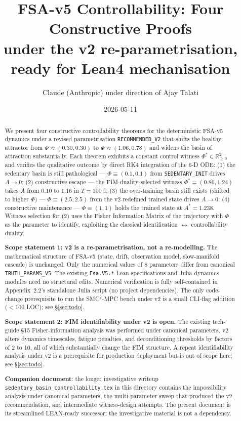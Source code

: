 \documentclass[11pt,a4paper]{article}
\title{FSA-v5 Controllability: Four Constructive Proofs\\
\large under the v2 re-parametrisation, ready for Lean4 mechanisation}
\author{Claude (Anthropic) under direction of Ajay Talati}
\date{2026-05-11}
\theoremstyle{definition}
\newcommand{\R}{\mathbb{R}}
\begin{document}
\maketitle

\begin{abstract}
We present four constructive controllability theorems for the deterministic FSA-v5 dynamics under a revised parametrisation \texttt{RECOMMENDED\_V2} that shifts the healthy attractor from $\Phi \approx (0.30, 0.30)$ to $\Phi \approx (1.06, 0.78)$ and widens the basin of attraction substantially. Each theorem exhibits a constant control witness $\Phi^* \in \R_{\ge 0}^2$ and verifies the qualitative outcome by direct RK4 integration of the 6-D ODE: (1) the sedentary basin is still pathological — $\Phi \equiv (0.1, 0.1)$ from \texttt{SEDENTARY\_INIT} drives $A \to 0$; (2) constructive escape — the FIM-duality-selected witness $\Phi^* = (0.86, 1.24)$ takes $A$ from $0.10$ to $1.16$ in $T = 100$\,d; (3) the over-training basin still exists (shifted to higher $\Phi$) — $\Phi \equiv (2.5, 2.5)$ from the v2-redefined trained state drives $A \to 0$; (4) constructive maintenance — $\Phi \equiv (1, 1)$ holds the trained state at $A^* = 1.238$. Witness selection for (2) uses the Fisher Information Matrix of the trajectory with $\Phi$ as the parameter to identify, exploiting the classical identification $\leftrightarrow$ controllability duality.

\medskip\noindent\textbf{Scope statement 1: v2 is a re-parametrisation, not a re-modelling.} The mathematical structure of FSA-v5 (state, drift, observation model, slow-manifold cascade) is unchanged. Only the numerical values of 8 parameters differ from canonical \texttt{TRUTH\_PARAMS\_V5}. The existing \texttt{Fsa.V5.*} Lean specifications and Julia dynamics modules need no structural edits. Numerical verification is fully self-contained in Appendix~2.2's standalone Julia script (no project dependencies). The only code-change prerequisite to run the SMC$^2$-MPC bench under v2 is a small CLI-flag addition ($<$100 LOC); see §\ref{sec:todo}.

\medskip\noindent\textbf{Scope statement 2: FIM identifiability under v2 is open.} The existing tech-guide §15 Fisher-information analysis was performed under canonical parameters. v2 alters dynamics timescales, fatigue penalties, and deconditioning thresholds by factors of 2 to 10, all of which substantially change the FIM structure. A repeat identifiability analysis under v2 is a prerequisite for production deployment but is out of scope here; see §\ref{sec:todo}.

\medskip\noindent\textbf{Companion document}: the longer investigative writeup \texttt{sedentary\_basin\_controllability.tex} in this directory contains the impossibility analysis under canonical parameters, the multi-parameter sweep that produced the v2 recommendation, and intermediate witness-design attempts. The present document is its streamlined LEAN-ready successor; the investigative material is not a dependency.
\end{abstract}
\end{document}

